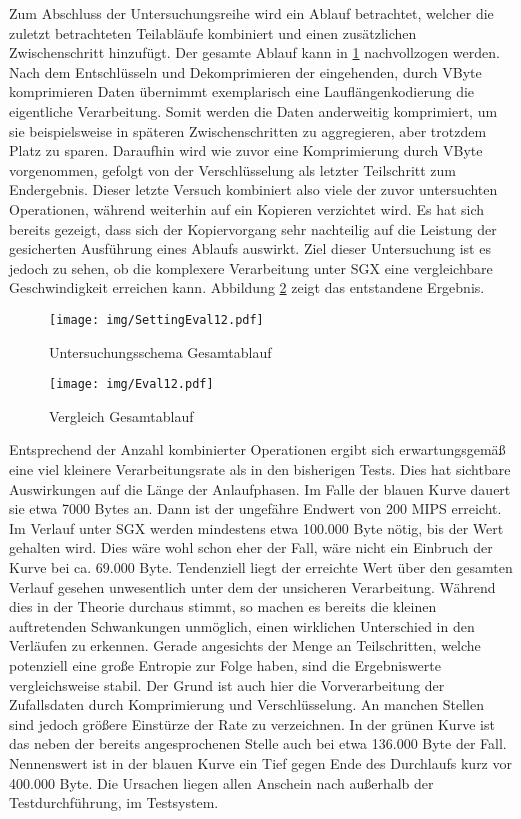 Zum Abschluss der Untersuchungsreihe wird ein Ablauf betrachtet, welcher die zuletzt betrachteten Teilabläufe kombiniert und einen zusätzlichen Zwischenschritt hinzufügt. Der gesamte Ablauf kann in \ref{fig:settingeval12} nachvollzogen werden. Nach dem Entschlüsseln und Dekomprimieren der eingehenden, durch VByte komprimieren Daten übernimmt exemplarisch eine Lauflängenkodierung die eigentliche Verarbeitung. Somit werden die Daten anderweitig komprimiert, um sie beispielsweise in späteren Zwischenschritten zu aggregieren, aber trotzdem Platz zu sparen. Daraufhin wird wie zuvor eine Komprimierung durch VByte vorgenommen, gefolgt von der Verschlüsselung als letzter Teilschritt zum Endergebnis. Dieser letzte Versuch kombiniert also viele der zuvor untersuchten Operationen, während weiterhin auf ein Kopieren verzichtet wird. Es hat sich bereits gezeigt, dass sich der Kopiervorgang sehr nachteilig auf die Leistung der gesicherten Ausführung eines Ablaufs auswirkt. Ziel dieser Untersuchung ist es jedoch zu sehen, ob die komplexere Verarbeitung unter \ac{SGX} eine vergleichbare Geschwindigkeit erreichen kann. Abbildung \ref{fig:eval12} zeigt das entstandene Ergebnis.

\begin{figure}[H]
	\texttt{[image: img/SettingEval12.pdf]}
	\centering
	\caption{Untersuchungsschema Gesamtablauf}
	\label{fig:settingeval12}
\end{figure}

\begin{figure}[H]
	\texttt{[image: img/Eval12.pdf]}
	\centering
	\caption{Vergleich Gesamtablauf}
	\label{fig:eval12}
\end{figure}

Entsprechend der Anzahl kombinierter Operationen ergibt sich erwartungsgemäß eine viel kleinere Verarbeitungsrate als in den bisherigen Tests. Dies hat sichtbare Auswirkungen auf die Länge der Anlaufphasen. Im Falle der blauen Kurve dauert sie etwa 7000 Bytes an. Dann ist der ungefähre Endwert von 200 \ac{MIPS} erreicht. Im Verlauf unter \ac{SGX} werden mindestens etwa 100.000 Byte nötig, bis der Wert gehalten wird. Dies wäre wohl schon eher der Fall, wäre nicht ein Einbruch der Kurve bei ca. 69.000 Byte. Tendenziell liegt der erreichte Wert über den gesamten Verlauf gesehen unwesentlich unter dem der unsicheren Verarbeitung. Während dies in der Theorie durchaus stimmt, so machen es bereits die kleinen auftretenden Schwankungen unmöglich, einen wirklichen Unterschied in den Verläufen zu erkennen. Gerade angesichts der Menge an Teilschritten, welche potenziell eine große Entropie zur Folge haben, sind die Ergebniswerte vergleichsweise stabil. Der Grund ist auch hier die Vorverarbeitung der Zufallsdaten durch Komprimierung und Verschlüsselung. An manchen Stellen sind jedoch größere Einstürze der Rate zu verzeichnen. In der grünen Kurve ist das neben der bereits angesprochenen Stelle auch bei etwa 136.000 Byte der Fall. Nennenswert ist in der blauen Kurve ein Tief gegen Ende des Durchlaufs kurz vor 400.000 Byte. Die Ursachen liegen allen Anschein nach außerhalb der Testdurchführung, im Testsystem.

